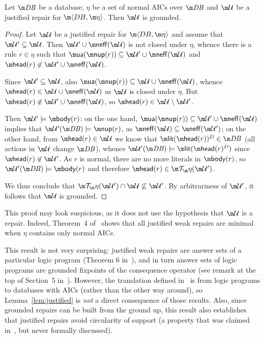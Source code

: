 \begin{lemma}
  \label{lem:justified}
  Let $\db$ be a database, $\eta$ be a set of normal AICs over $\db$ and $\UU$ be a justified repair for $\fulldb$.
  Then $\UU$ is grounded.
\end{lemma}
\begin{proof}
  Let $\UU$ be a justified repair for $\fulldb$ and assume that $\UU'\subsetneq\UU$.
  Then $\UU'\cup\neff(\UU)$ is not closed under $\eta$, whence there is a rule $r\in\eta$ such that $\actof(\nup(r))\subseteq\UU'\cup\neff(\UU)$ and $\head(r)\not\in\UU'\cup\neff(\UU)$.

  Since $\UU'\subseteq\UU$, also $\actof(\nup(r))\subseteq\UU\cup\neff(\UU)$, whence $\head(r)\in\UU\cup\neff(\UU)$ as $\UU$ is closed under $\eta$.
  But $\head(r)\not\in\UU'\cup\neff(\UU)$, so $\head(r)\in\UU\setminus\UU'$.

  Then $\UU'\models\body(r)$: on the one hand, $\actof(\nup(r))\subseteq\UU'\cup\neff(\UU)$ implies that $\UU'(\db)\models\nup(r)$, as $\neff(\UU)\subseteq\neff(\UU')$; on the other hand, from $\head(r)\in\UU$ we know that $\litof(\head(r))^D\in\db$ (all actions in $\UU$ change $\db$), whence $\UU'(\db)\models\litof(\head(r)^D)$ since $\head(r)\not\in\UU'$.
  As $r$ is normal, there are no more literals in $\body(r)$, so $\UU'(\db)\models\body(r)$ and therefore $\head(r)\in\Op(\UU')$.

  We thus conclude that $\Op(\UU')\cap\UU\not\subseteq\UU'$.
  By arbitrariness of $\UU'$, it follows that $\UU$ is grounded.
\end{proof}
This proof may look suspicious, as it does not use the hypothesis that $\UU$ is a repair.
Indeed, Theorem~4 of~\cite{Caroprese2011} shows that all justified weak repairs are minimal when $\eta$ contains only normal AICs.

This result is not very surprising: justified weak repairs are answer sets of a particular logic program (Theorem 6 in~\cite{Caroprese2011}), and in turn answer sets of logic programs are grounded fixpoints of the consequence operator (see remark at the top of Section~5 in~).
However, the translation defined in~\cite{Caroprese2011} is from logic programs to databases with AICs (rather than the other way around), so Lemma~\ref{lem:justified} is \emph{not} a direct consequence of those results.
Also, since grounded repairs can be built from the ground up, this result also establishes that justified repairs avoid circularity of support (a property that was claimed in~\cite{Caroprese2011}, but never formally discussed).

